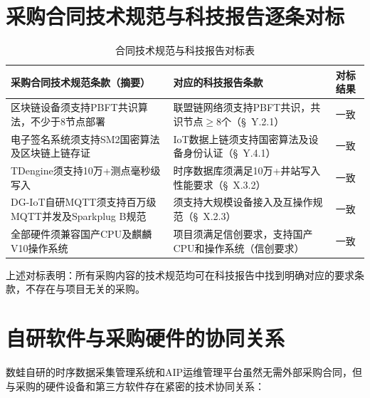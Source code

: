 \documentclass[12pt,a4paper]{ctexart}
\begin{document}
\section{采购合同技术规范与科技报告逐条对标}

\begin{table}[H]
\centering
\caption{合同技术规范与科技报告对标表}
\begin{tabular}{@{}p{4cm} p{4cm} p{4cm}@{}}
\toprule
\textbf{采购合同技术规范条款（摘要）} & \textbf{对应的科技报告条款} & \textbf{对标结果} \\
\midrule
区块链设备须支持PBFT共识算法，不少于8节点部署 & 联盟链网络须支持PBFT共识，共识节点$\geq$8个（\S~Y.2.1） & 一致 \\
\addlinespace
电子签名系统须支持SM2国密算法及区块链上链存证 & IoT数据上链须支持国密算法及设备身份认证（\S~Y.4.1） & 一致 \\
\addlinespace
TDengine须支持10万+测点毫秒级写入 & 时序数据库须满足10万+井站写入性能要求（\S~X.3.2） & 一致 \\
\addlinespace
DG-IoT自研MQTT须支持百万级MQTT并发及Sparkplug B规范 & 须支持大规模设备接入及互操作规范（\S~X.2.3） & 一致 \\
\addlinespace
全部硬件须兼容国产CPU及麒麟V10操作系统 & 项目须满足信创要求，支持国产CPU和操作系统（信创要求） & 一致 \\
\bottomrule
\end{tabular}
\end{table}

上述对标表明：所有采购内容的技术规范均可在科技报告中找到明确对应的要求条款，不存在与项目无关的采购。

\section{自研软件与采购硬件的协同关系}

数蛙自研的时序数据采集管理系统和AIP运维管理平台虽然无需外部采购合同，但与采购的硬件设备和第三方软件存在紧密的技术协同关系：
\end{document}
